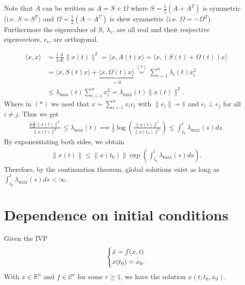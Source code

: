 \begin{remark}[]
	Note that ${A} $ can be written as ${A}={S} +{\Omega }$ where ${S} = \frac{1}{2}({A} + {A}^T)$ is symmetric (i.e. ${S} = {S}^T)$ and ${\Omega} = \frac{1}{2}({A} - {A}^T)$ is skew symmetric (i.e. ${\Omega} = -{\Omega}^T$). Furthermore the eigenvalues of ${S}$, $\lambda_i$, are all real and their respective eigenvectors, $e_i$, are orthogonal.
\end{remark}

\begin{ex}
	\begin{subequations}\begin{align}
	\langle  {x}, \dot{ {x}} \rangle &= \frac{1}{2} \frac{d}{dt}  \| {x}(t) \|^2 = \langle  {x}, {A}(t)  {x}\rangle = \langle  {x}, ({S}(t) + {\Omega}(t) )  {x} \rangle \\
				   &= \langle  {x}, S(t)  {x} \rangle + \underbrace{\langle  {x}, {\Omega}(t)  {x} \rangle}_{=0} \stackrel{(*)}{=} 
				   \sum_{i=1}^{n} \lambda_i(t) x_i^2 \\
				   &\leq \lambda_{ \textrm{max} }(t) \sum_{i=1}^{n} x_i^2 = \lambda _{ \textrm{max} }(t)  \|  {x}(t) \|^2.
\end{align}\end{subequations}
Where in $(*)$ we used that $ {x} = \sum_{i=1}^{n} x_i  {e}_i $ with $ \| {e}_i \|=1$ and $ {e}_i \perp  {e}_j$ for all $i \neq j$. Thus we get
\begin{align}
	\frac{\frac{1}{2}\frac{d}{dt} \| {x}(t) \|^2}{ \| {x}(t) \|^2} \leq \lambda_{ \textrm{max} }(t) 
	\implies \frac{1}{2}\log \left( \frac{ \| {x}(t) \|^2}{ \| {x}(t_0) \|^2} \right)  \leq \int_{t_0}^{t}  \lambda _{ \textrm{max} }(s) ds.
\end{align}
By exponentiating both sides, we obtain
\begin{align}
\boxed{  \| {x}(t) \| \leq  \| {x}(t_0)  \| \exp\left(\int_{t_0}^{t} \lambda_{ \textrm{max} }(s)ds\right).}
\end{align}
Therefore, by the continuation theorem, global solutions exist as long as $\int_{t_0}^{t} \lambda_{ \textrm{max} }(s) ds < \infty $.
\end{ex}

\section{Dependence on initial conditions}
Given the IVP
\begin{align}
	\begin{dcases}
	\dot{ {x}} = f( {x},t) \\  {x}(t_0) =  {x}_0.
	\end{dcases}
\end{align}
With $ {x} \in \mathbb{R}^{n}$ and $f\in \mathcal{C}^r$ for some $r\geq 1$, we have the solution $ {x}(t; t_0,  {x}_0)$.

